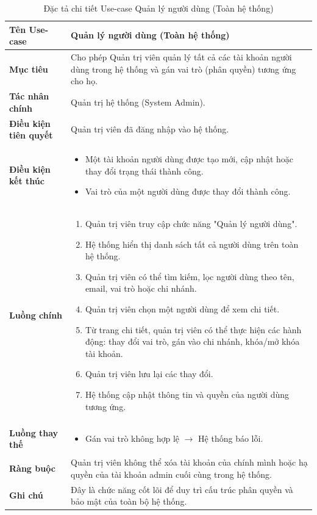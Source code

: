 \begin{table}[H]
\centering
\renewcommand{\arraystretch}{1.3}
\begin{tabular}{|p{4cm}|p{10cm}|}
\hline
\textbf{Tên Use-case} 
& Quản lý người dùng (Toàn hệ thống) \\ 
\hline

\textbf{Mục tiêu} 
& Cho phép Quản trị viên quản lý tất cả các tài khoản người dùng trong hệ thống và gán vai trò (phân quyền) tương ứng cho họ. \\ 
\hline

\textbf{Tác nhân chính} 
& Quản trị hệ thống (System Admin). \\ 
\hline

\textbf{Điều kiện tiên quyết} 
& Quản trị viên đã đăng nhập vào hệ thống. \\ 
\hline

\textbf{Điều kiện kết thúc} 
& 
\begin{itemize}
\item Một tài khoản người dùng được tạo mới, cập nhật hoặc thay đổi trạng thái thành công.
\item Vai trò của một người dùng được thay đổi thành công.
\end{itemize} \\ 
\hline

\textbf{Luồng chính} 
& 
\begin{enumerate}
    \item Quản trị viên truy cập chức năng "Quản lý người dùng".
    \item Hệ thống hiển thị danh sách tất cả người dùng trên toàn hệ thống.
    \item Quản trị viên có thể tìm kiếm, lọc người dùng theo tên, email, vai trò hoặc chi nhánh.
    \item Quản trị viên chọn một người dùng để xem chi tiết.
    \item Từ trang chi tiết, quản trị viên có thể thực hiện các hành động: thay đổi vai trò, gán vào chi nhánh, khóa/mở khóa tài khoản.
    \item Quản trị viên lưu lại các thay đổi.
    \item Hệ thống cập nhật thông tin và quyền của người dùng tương ứng.
\end{enumerate} \\ 
\hline

\textbf{Luồng thay thế} 
& 
\begin{itemize}
    \item Gán vai trò không hợp lệ $\rightarrow$ Hệ thống báo lỗi.
\end{itemize} \\ 
\hline

\textbf{Ràng buộc} 
& Quản trị viên không thể xóa tài khoản của chính mình hoặc hạ quyền của tài khoản admin cuối cùng trong hệ thống. \\ 
\hline

\textbf{Ghi chú} 
& Đây là chức năng cốt lõi để duy trì cấu trúc phân quyền và bảo mật của toàn bộ hệ thống. \\ 
\hline
\end{tabular}
\caption{Đặc tả chi tiết Use-case Quản lý người dùng (Toàn hệ thống)}
\label{tab:sysadmin-user-spec}
\end{table}
